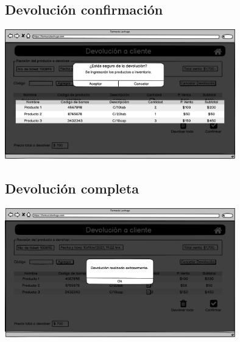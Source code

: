 \begin{flushleft}
	\subsection{Devolución confirmación} \label{UI: devolucion confirmación}
	\begin{center}
		\includegraphics[width=10cm]{pantallas/images/23devolucionconfirmacion.png}\\	
		 	
	\end{center}
	\subsection{Devolución completa} \label{UI: devolucion completa}
	\begin{center}
		\includegraphics[width=10cm]{pantallas/images/24devolucioncompleta.png}\\	
		 	
	\end{center}

\end{flushleft}
